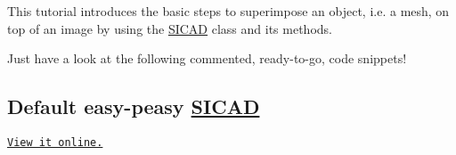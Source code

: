 This tutorial introduces the basic steps to superimpose an object, i.\+e. a mesh, on top of an image by using the \mbox{\hyperlink{classSICAD}{S\+I\+C\+AD}} class and its methods.~\newline


Just have a look at the following commented, ready-\/to-\/go, code snippets!~\newline


\subsection*{Default easy-\/peasy \mbox{\hyperlink{classSICAD}{S\+I\+C\+AD}}}





\href{https://github.com/robotology/superimpose-mesh-lib/blob/master/doc/tutorial_code/tutorial_superimpose.cpp}{\tt View it online.} 
